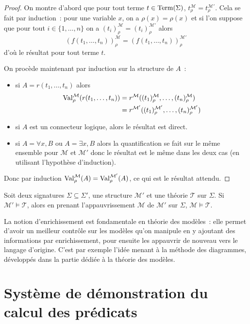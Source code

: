 \begin{proof}
  On montre d'abord que pour tout terme $t\in\operatorname{Term}(\Sigma)$,
  $t_\rho^\mathcal M = t_\rho^{\mathcal M'}$. Cela se fait par induction~: pour une
  variable $x$, on a $\rho(x) = \rho(x)$ et si l'on suppose que pour tout
  $i\in\{1,\ldots,n\}$ on a $(t_i)_\rho^\mathcal M = (t_i)_\rho^{\mathcal M'}$ alors
  \[(f(t_1,\ldots,t_n))_\rho^\mathcal M = (f(t_1,\ldots,t_n))_\rho^{\mathcal M'}\]
  d'où le résultat pour tout terme $t$.
  
  On procède maintenant par induction sur la structure de $A$~:
  \begin{itemize}
  \item si $A = r(t_1,\ldots,t_n)$ alors
    \begin{align*}
      \operatorname{Val}_\rho^\mathcal M(r(t_1,\ldots,t_n)) &= r^\mathcal M((t_1)_\rho^\mathcal M,
      \ldots,(t_n)_\rho^\mathcal M) \\
      &= r^{\mathcal M'}((t_1)_\rho^{\mathcal M'},\ldots,(t_n)_{\rho}^{\mathcal M'})
    \end{align*}
  \item si $A$ est un connecteur logique, alors le résultat est direct.
  \item si $A = \forall x, B$ ou $A = \exists x, B$ alors la quantification se
    fait sur le même ensemble pour $\mathcal M$ et $\mathcal M'$ donc le
    résultat est le même dans les deux cas (en utilisant l'hypothèse
    d'induction).
  \end{itemize}
  Donc par induction $\operatorname{Val}_\rho^\mathcal M(A) = \operatorname{Val}_\rho^{\mathcal M'}(A)$,
  ce qui est le résultat attendu.
\end{proof}

\begin{corollary}
  Soit deux signatures $\Sigma\subseteq\Sigma'$, une structure $\mathcal M'$
  et une théorie $\mathcal T$ sur $\Sigma$. Si $\mathcal M'\models \mathcal T$,
  alors en prenant l'appauvrissement $\mathcal M$ de $\mathcal M'$ sur $\Sigma$,
  $\mathcal M\models \mathcal T$.
\end{corollary}

La notion d'enrichissement est fondamentale en théorie des modèles~: elle
permet d'avoir un meilleur contrôle sur les modèles qu'on manipule en y ajoutant
des informations par enrichissement, pour ensuite les appauvrir de nouveau vers
le langage d'origine. C'est par exemple l'idée menant à la méthode des
diagrammes, développés dans la partie dédiée à la théorie des modèles.

\section[Syntaxe de preuves]{Système de démonstration du calcul des prédicats}

